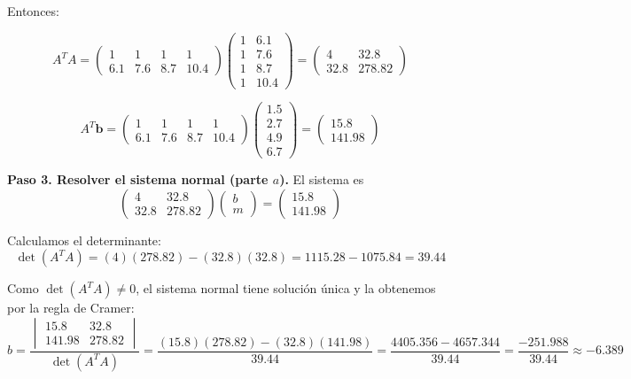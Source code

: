 \begin{example}
\begin{myproof}
Entonces:

\[
A^TA = \begin{pmatrix}
1 & 1 & 1 & 1 \\
6.1 & 7.6 & 8.7 & 10.4
\end{pmatrix}
\begin{pmatrix}
1 & 6.1 \\
1 & 7.6 \\
1 & 8.7 \\
1 & 10.4
\end{pmatrix} = \begin{pmatrix}
4 & 32.8 \\
32.8 & 278.82
\end{pmatrix}
\]

\[
A^T\mathbf{b} = \begin{pmatrix}
1 & 1 & 1 & 1 \\
6.1 & 7.6 & 8.7 & 10.4
\end{pmatrix}
\begin{pmatrix}
1.5 \\ 2.7 \\ 4.9 \\ 6.7
\end{pmatrix} = \begin{pmatrix}
15.8 \\ 141.98
\end{pmatrix}
\]

\textbf{Paso 3. Resolver el sistema normal (parte $a$).} El sistema es
\[
\begin{pmatrix}
4 & 32.8 \\
32.8 & 278.82
\end{pmatrix}
\begin{pmatrix}
b \\ m
\end{pmatrix} =
\begin{pmatrix}
15.8 \\ 141.98
\end{pmatrix}
\]

Calculamos el determinante:
\[
\det(A^TA) = (4)(278.82) - (32.8)(32.8) = 1115.28 - 1075.84 = 39.44
\]

Como $\det(A^TA) \neq 0$, el sistema normal tiene solución única y la obtenemos por la regla de Cramer:
\[
b = \frac{
\begin{vmatrix}
15.8 & 32.8 \\
141.98 & 278.82
\end{vmatrix}
}{\det(A^TA)} = \frac{(15.8)(278.82) - (32.8)(141.98)}{39.44} = \frac{4405.356 - 4657.344}{39.44} = \frac{-251.988}{39.44} \approx -6.389
\]


\end{myproof}
\end{example}
